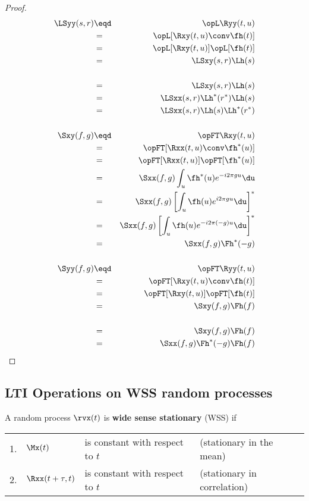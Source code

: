 \begin{proof}
\begin{eqnarray*}
   \LSyy(s,r)
     &\eqd& \opL\Ryy(t,u)
   \\&=&    \opL[\Rxy(t,u) \conv \fh(t)]
   \\&=&    \opL[\Rxy(t,u)]\opL[\fh(t)]
   \\&=&    \LSxy(s,r) \Lh(s)
\\
   \\&=&    \LSxy(s,r) \Lh(s)
   \\&=&    \LSxx(s,r) \Lh^\ast(r^\ast)\Lh(s)
   \\&=&    \LSxx(s,r) \Lh(s) \Lh^\ast(r^\ast)
\\ \\
   \Sxy(f,g)
     &\eqd& \opFT\Rxy(t,u)
   \\&=&    \opFT[\Rxx(t,u) \conv \fh^\ast(u)]
   \\&=&    \opFT[\Rxx(t,u)]\opFT[\fh^\ast(u)]
   \\&=&    \Sxx(f,g) \int_u \fh^\ast(u) e^{-i2\pi g u} \du
   \\&=&    \Sxx(f,g) \left[\int_u \fh(u) e^{i2\pi g u} \du \right]^\ast
   \\&=&    \Sxx(f,g) \left[\int_u \fh(u) e^{-i2\pi(-g)u} \du \right]^\ast
   \\&=&    \Sxx(f,g) \Fh^\ast(-g)
\\ \\
   \Syy(f,g)
     &\eqd& \opFT\Ryy(t,u)
   \\&=&    \opFT[\Rxy(t,u) \conv \fh(t)]
   \\&=&    \opFT[\Rxy(t,u)]\opFT[\fh(t)]
   \\&=&    \Sxy(f,g) \Fh(f)
\\
   \\&=&    \Sxy(f,g) \Fh(f)
   \\&=&    \Sxx(f,g) \Fh^\ast(-g) \Fh(f)
\end{eqnarray*}
\end{proof}


\subsection{LTI Operations on WSS random processes}
\begin{definition}
\label{def:WSS}
A random process $\rvx(t)$ is \textbf{wide sense stationary} (WSS) if

\begin{tabular}{llll}
   1. & $\Mx(t)$         & is constant with respect to $t$ & (stationary in the mean) \\
   2. & $\Rxx(t+\tau,t)$ & is constant with respect to $t$ & (stationary in correlation)
\end{tabular}
\end{definition}

